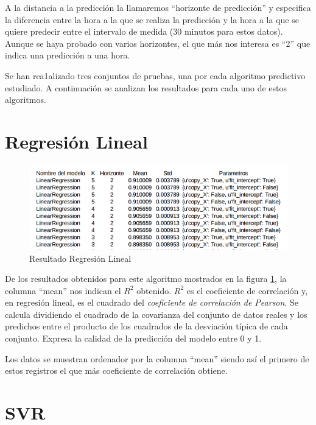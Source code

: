 A la distancia a la predicción la llamaremos ``horizonte de predicción'' y especifica la diferencia entre la hora a la que se realiza la predicción y la hora a la que se quiere predecir entre el intervalo de medida (30 minutos para estos datos). Aunque se haya probado con varios horizontes, el que más nos interesa es ``2'' que indica una predicción a una hora.

Se han rea1alizado tres conjuntos de pruebas, una por cada algoritmo predictivo estudiado. A continuación se analizan los resultados para cada uno de estos algoritmos.

\section{Regresión Lineal}
\label{makereference6.1}

\begin{figure}[htb]
	\begin{center}
		\includegraphics[width=14cm]{figures/resultado_linear.png}
		\caption{Resultado Regresión Lineal \label{resultado_linear}}
	\end{center}
\end{figure}

De los resultados obtenidos para este algoritmo mostrados en la figura \ref{resultado_linear}, la columna ``mean'' nos indican el \(R^{2}\) obtenido. \(R^{2}\) es el coeficiente de correlación y, en regresión lineal, es el cuadrado del \textit{coeficiente de correlación de Pearson}. Se calcula dividiendo el cuadrado de la covarianza del conjunto de datos reales y los predichos entre el producto de los cuadrados de la desviación típica de cada conjunto. Expresa la calidad de la predicción del modelo entre 0 y 1.

Los datos se muestran ordenador por la columna ``mean'' siendo así el primero de estos registros el que más coeficiente de correlación obtiene.

\section{SVR}
\label{makereference6.2}


